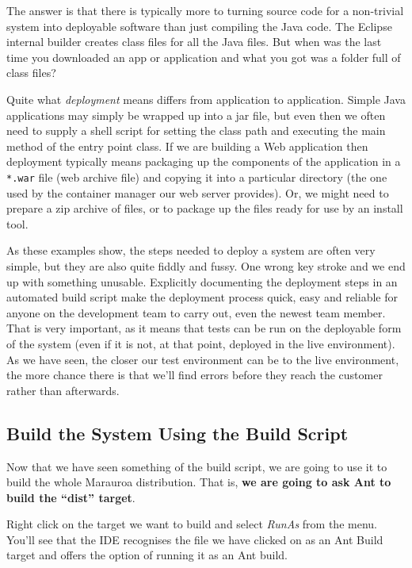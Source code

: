 \documentclass[
]{book}
\begin{document}
The answer is that there is typically more to turning source code for a non-trivial system into deployable software than just compiling the Java code. The Eclipse internal builder creates class files for all the Java files. But when was the last time you downloaded an app or application and what you got was a folder full of class files?

Quite what \emph{deployment} means differs from application to application. Simple Java applications may simply be wrapped up into a jar file, but even then we often need to supply a shell script for setting the class path and executing the main method of the entry point class. If we are building a Web application then deployment typically means packaging up the components of the application in a \texttt{*.war} file (web archive file) and copying it into a particular directory (the one used by the container manager our web server provides). Or, we might need to prepare a zip archive of files, or to package up the files ready for use by an install tool.

As these examples show, the steps needed to deploy a system are often very simple, but they are also quite fiddly and fussy. One wrong key stroke and we end up with something unusable. Explicitly documenting the deployment steps in an automated build script make the deployment process quick, easy and reliable for anyone on the development team to carry out, even the newest team member. That is very important, as it means that tests can be run on the deployable form of the system (even if it is not, at that point, deployed in the live environment). As we have seen, the closer our test environment can be to the live environment, the more chance there is that we'll find errors before they reach the customer rather than afterwards.

\hypertarget{buildscript}{%
\subsection{Build the System Using the Build Script}\label{buildscript}}

Now that we have seen something of the build script, we are going to use it to build the whole Marauroa distribution. That is, \textbf{we are going to ask Ant to build the ``dist'' target}.

Right click on the target we want to build and select \emph{RunAs} from the menu. You'll see that the IDE recognises the file we have clicked on as an Ant Build target and offers the option of running it as an Ant build.
\end{document}
